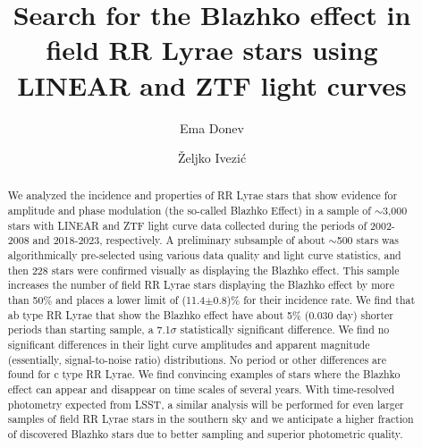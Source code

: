 \documentclass[twocolumn, linenumbers, tighten]{aastex631}
\begin{document}
\title{Search for the Blazhko effect in field RR Lyrae stars using LINEAR and ZTF light curves}

\author{Ema Donev}

\author[0000-0001-5250-2633]{\v{Z}eljko Ivezi\'{c}}



\begin{abstract}
We analyzed the incidence and properties of RR Lyrae stars that show evidence for amplitude and
phase modulation (the so-called Blazhko Effect) in a sample of $\sim$3,000 stars with LINEAR and ZTF light
curve data collected during the periods of 2002-2008 and 2018-2023, respectively. A preliminary subsample
of about $\sim$500 stars was algorithmically pre-selected using various data quality and light curve statistics,
and then 228 stars were confirmed visually as displaying the Blazhko effect. This sample increases the number
of field RR Lyrae stars displaying the Blazhko effect by more than 50\% and places a lower
limit of (11.4$\pm$0.8)\% for their incidence rate. We find that ab type RR Lyrae that show the Blazhko effect have
about 5\% (0.030 day) shorter periods than starting sample, a 7.1$\sigma$ statistically significant
difference. We find no significant differences in their light curve amplitudes and apparent magnitude (essentially,
signal-to-noise ratio) distributions. No period or other differences are found for c type RR Lyrae. We find convincing
examples of stars where the Blazhko effect can appear and disappear on time scales of several years.  With
time-resolved photometry expected from LSST, a similar analysis will be performed for even larger samples of field
RR Lyrae stars in the southern sky and we anticipate a higher fraction of discovered Blazhko stars due to better
sampling and superior photometric quality.
\end{abstract}
 





\end{document}
